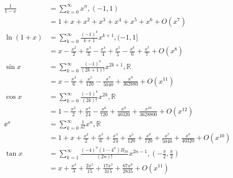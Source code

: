 \begin{equation*}
    \begin{aligned}
        \frac{1}{1-x} & = \sum_{k=0}^\infty x^n,(-1,1)                                                                                                                  \\
                      & = 1 + x + x^2 + x^3 + x^4 + x^5 + x^6 + O(x^7)                                                                                                  \\
        \ln(1+x)      & = \sum_{k=0}^\infty\frac{(-1)^k}{k+1}x^{k+1},(-1,1]                                                                                             \\
                      & = x - \frac{x^2}{2} + \frac{x^3}{3} - \frac{x^4}{4} + \frac{x^5}{5} - \frac{x^6}{6} + \frac{x^7}{7} + O(x^8)                                    \\
        \sin x        & = \sum_{k=0}^\infty \frac{(-1)^k}{(2k+1)!}x^{2k+1},\mathbb{R}                                                                                   \\
                      & = x - \frac{x^3}{6} + \frac{x^5}{120} - \frac{x^7}{5040} + \frac{x^9}{362880}+ O(x^{11})                                                        \\
        \cos x        & = \sum_{k=0}^\infty \frac{(-1)^k}{(2k)!}x^{2k},\mathbb{R}                                                                                       \\
                      & = 1 - \frac{x^2}{2} + \frac{x^4}{24} - \frac{x^6}{720} + \frac{x^8}{40320} + \frac{x^{10}}{3628800} + O(x^{12})                                 \\
        \ee^x         & = \sum_{k=0}^\infty\frac{1}{n!}x^n,\mathbb{R}                                                                                                   \\
                      & = 1 + x + \frac{x^2}{2} + \frac{x^3}{6} + \frac{x^4}{24} + \frac{x^5}{120} + \frac{x^6}{720} + \frac{x^7}{5040} + \frac{x^8}{40320} + O(x^{10}) \\
        \tan x        & = \sum_{k=1}^\infty \frac{(-4)^n(1-4^n)B_{2n}}{(2n)!}x^{2n-1},(-\frac{\pi}{2},\frac{\pi}{2})                                                    \\
                      & = x + \frac{x^3}{3} + \frac{2x^5}{15} + \frac{17x^{7}}{315} + \frac{67x^9}{2835} + O(x^{11})
    \end{aligned}
\end{equation*}

